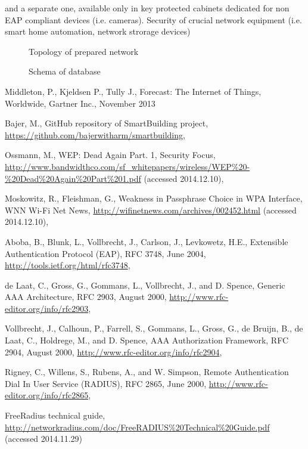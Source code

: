 \documentclass{llncs}
\begin{document}
 and a separate one, available only in
key protected cabinets dedicated for non EAP compliant devices (i.e. cameras).
Security of crucial network equipment (i.e. smart home automation, network
strorage devices)
 




\begin{figure}
\vspace{-15pt}
\caption{Topology of prepared network}
\end{figure}

\begin{figure}
\vspace{-15pt}
\caption{Schema of database}
\end{figure}



%
%
\begin{thebibliography}{}
%
Middleton, P., Kjeldsen P., Tully J., Forecast: The Internet of Things,
Worldwide, Gartner Inc., November 2013

Bajer, M., GitHub repository of SmartBuilding project, 
\url{https://github.com/bajerwitharm/smartbuilding},

Ossmann, M., WEP: Dead Again Part. 1, Security Focus, 
\url{http://www.bandwidthco.com/sf_whitepapers/wireless/WEP%20-%20Dead%20Again%20Part%201.pdf}
(accessed 2014.12.10),

Moskowitz, R., Fleishman, G., Weakness in Passphrase Choice in WPA Interface,
WNN Wi-Fi Net News, 
\url{http://wifinetnews.com/archives/002452.html} (accessed 2014.12.10),

Aboba, B., Blunk, L., Vollbrecht, J., Carlson, J., Levkowetz, H.E., Extensible Authentication Protocol (EAP), RFC 3748, June 2004,
\url{http://tools.ietf.org/html/rfc3748},

de Laat, C., Gross, G., Gommans, L., Vollbrecht, J., and D. Spence, Generic AAA
Architecture, RFC 2903, August 2000,
\url{http://www.rfc-editor.org/info/rfc2903},

Vollbrecht, J., Calhoun, P., Farrell, S., Gommans, L., Gross, G., de Bruijn, B.,
de Laat, C., Holdrege, M., and D. Spence, AAA Authorization Framework, RFC
2904, August 2000, \url{http://www.rfc-editor.org/info/rfc2904},

Rigney, C., Willens, S., Rubens, A., and W. Simpson, Remote  Authentication
Dial In User Service (RADIUS), RFC 2865, June 2000,
\url{http://www.rfc-editor.org/info/rfc2865},

FreeRadius technical guide,
\url{http://networkradius.com/doc/FreeRADIUS%20Technical%20Guide.pdf} (accessed 2014.11.29)

\end{thebibliography}
\end{document}

